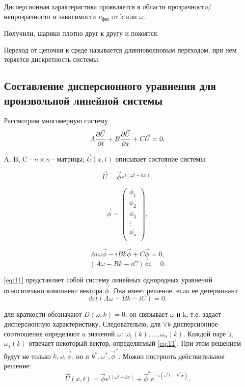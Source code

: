 Дисперсионная характеристика проявляется в области прозрачности/непрозрачности и зависимости $v_\text{фаз}$ от k или $\omega$.

Получили, шарики плотно друг к другу и покоятся.

Переход от цепочки к среде называется длинноволновым переходом. при нем теряется дискретность системы.

\subsection{Составление дисперсионного уравнения для произвольной линейной системы}

Рассмотрим многомерную систему
\begin{equation}
	A\pdv{\vec{U}}{t}+B\pdv{\vec{U}}{x}+C\vec{U}=0.
	\label{eq:9}
\end{equation}

A, B, C - $n\times n$ - матрицы; $\vec{U}(x,t)$ описывает состояние системы.

\begin{equation}
	\vec{U}=\vec{\phi} e^{i(\omega t - kx)}.
	\label{eq:10}
\end{equation}

\begin{equation*}
	\vec\phi=
	\begin{pmatrix}
		\phi_1 \\
		\phi_2 \\
		\phi_3 \\
		\vdots \\
		\phi_n \\
	\end{pmatrix}
	,
\end{equation*}

\begin{equation*}
	Ai\omega\vec\phi-iBk\vec\phi+C\vec\phi=0,
\end{equation*}
\begin{equation}
	(A\omega-Bk-iC)\vec\phi i=0.
	\label{eq:11}
\end{equation}

\eqref{eq:11} представляет собой систему линейных однородных уравнений относительно компонент вектора $\vec\phi$. Она имеет решение, если ее детерминант
\begin{equation}
	det(A\omega-Bk-iC)=0.
	\label{eq:12}
\end{equation}

для краткости обозначают $D(\omega,k)=0$. он связывает $\omega$ и k, т.е. задает дисперсионную характеристику. Следовательно, для $\forall k$ дисперсионное соотношение определяют n значений $\omega$: $\omega_1(k), \dots, \omega_n(k)$. Каждой паре k, $\omega_s(k)$ отвечает некоторый вектор, определяемый \eqref{eq:11}. При этом решением будут не только $k, \omega, \vec\phi$, но и $k^*, \omega^*, \vec\phi^*$. Можно построить действительное решение:
\begin{equation}
	\vec{U}(x,t)=\vec\phi e^{i(\omega t-kx)}+\vec\phi^* e^{-i(\omega^* t-k^*x)}.
	\label{eq:13}
\end{equation}

